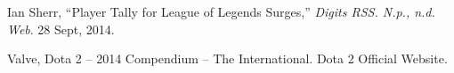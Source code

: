 \documentclass[conference]{IEEEtran}
\begin{document}















%
%
%


\begin{thebibliography}{10}

Ian Sherr, ``Player Tally for League of Legends Surges,'' \textit{Digits RSS. N.p., n.d. Web}. 28 Sept, 2014.

Valve, Dota 2 -- 2014 Compendium -- The International. Dota 2 Official Website.

\end{thebibliography}




\end{document}
